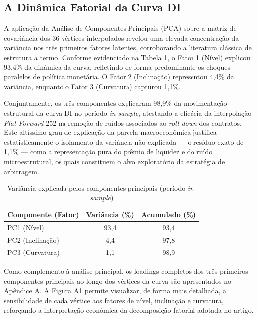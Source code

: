 \documentclass[fleqn]{rbfin}
\begin{document}
\subsection{A Dinâmica Fatorial da Curva DI}

A aplicação da Análise de Componentes Principais (PCA) sobre a matriz de covariância dos 36 vértices interpolados revelou uma elevada concentração da variância nos três primeiros fatores latentes, corroborando a literatura clássica de estrutura a termo. Conforme evidenciado na Tabela \ref{tab:variancia_pca}, o Fator 1 (Nível) explicou 93,4\% da dinâmica da curva, refletindo de forma predominante os choques paralelos de política monetária. O Fator 2 (Inclinação) representou 4,4\% da variância, enquanto o Fator 3 (Curvatura) capturou 1,1\%. 

Conjuntamente, os três componentes explicaram 98,9\% da movimentação estrutural da curva DI no período \textit{in-sample}, atestando a eficácia da interpolação \textit{Flat Forward} 252 na remoção de ruídos associados ao \textit{roll-down} dos contratos. Este altíssimo grau de explicação da parcela macroeconômica justifica estatisticamente o isolamento da variância não explicada — o resíduo exato de 1,1\% — como a representação pura do prêmio de liquidez e do ruído microestrutural, os quais constituem o alvo exploratório da estratégia de arbitragem.



\begin{table}[ht]
\centering
\caption{Variância explicada pelos componentes principais (período \textit{in-sample})}
\label{tab:variancia_pca}
\begin{tabular}{lcc}
\toprule
\textbf{Componente (Fator)} & \textbf{Variância (\%)} & \textbf{Acumulado (\%)} \\
\midrule
PC1 (Nível)       & 93,4 & 93,4 \\
PC2 (Inclinação)  & 4,4  & 97,8 \\
PC3 (Curvatura)   & 1,1  & 98,9 \\
\bottomrule
\end{tabular}
\end{table}

Como complemento à análise principal, os loadings completos dos três primeiros componentes principais ao longo dos vértices da curva são apresentados no Apêndice A. A Figura A1 permite visualizar, de forma mais detalhada, a sensibilidade de cada vértice aos fatores de nível, inclinação e curvatura, reforçando a interpretação econômica da decomposição fatorial adotada no artigo.
\end{document}
